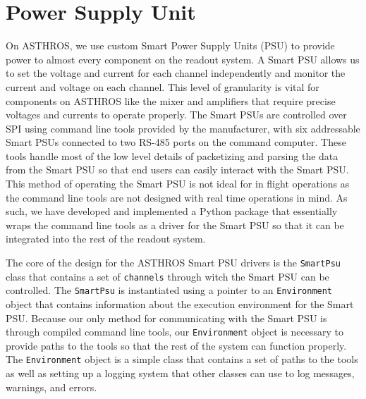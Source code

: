 \section{Power Supply Unit}
On ASTHROS, we use custom Smart Power Supply Units (PSU) to provide power to almost every component on the readout system.
A Smart PSU allows us to set the voltage and current for each channel independently and monitor the current and voltage on each channel.
This level of granularity is vital for components on ASTHROS like the mixer and amplifiers that require precise voltages and currents to operate properly.
The Smart PSUs are controlled over SPI using command line tools provided by the manufacturer, with six addressable Smart PSUs connected to two RS-485 ports on the command computer.
These tools handle most of the low level details of packetizing and parsing the data from the Smart PSU so that end users can easily interact with the Smart PSU. 
This method of operating the Smart PSU is not ideal for in flight operations as the command line tools are not designed with real time operations in mind. 
As such, we have developed and implemented a Python package that essentially wraps the command line tools as a driver for the Smart PSU so that it can be integrated into the rest of the readout system. 

The core of the design for the ASTHROS Smart PSU drivers is the \texttt{SmartPsu} class that contains a set of \texttt{channels} through witch the Smart PSU can be controlled.
The \texttt{SmartPsu} is instantiated using a pointer to an \texttt{Environment} object that contains information about the execution environment for the Smart PSU.
Because our only method for communicating with the Smart PSU is through compiled command line tools, our \texttt{Environment} object is necessary to provide paths to the tools so that the rest of the system can function properly. 
The \texttt{Environment} object is a simple class that contains a set of paths to the tools as well as setting up a logging system that other classes can use to log messages, warnings, and errors. 

